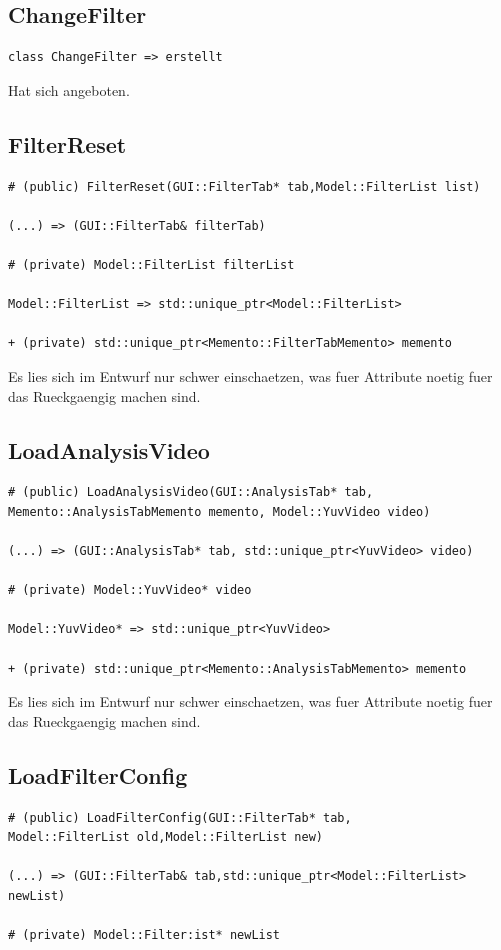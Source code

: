 \documentclass{scrartcl}
\begin{document}
{\subsection{ChangeFilter}
\begin{verbatim}
class ChangeFilter => erstellt
\end{verbatim}
Hat sich angeboten.
\subsection{FilterReset}
\begin{verbatim}
# (public) FilterReset(GUI::FilterTab* tab,Model::FilterList list)

(...) => (GUI::FilterTab& filterTab)

# (private) Model::FilterList filterList

Model::FilterList => std::unique_ptr<Model::FilterList>

+ (private) std::unique_ptr<Memento::FilterTabMemento> memento
\end{verbatim}
Es lies sich im Entwurf nur schwer einschaetzen, was fuer Attribute noetig fuer das Rueckgaengig machen sind. 
\subsection{LoadAnalysisVideo}
\begin{verbatim}
# (public) LoadAnalysisVideo(GUI::AnalysisTab* tab, 
Memento::AnalysisTabMemento memento, Model::YuvVideo video)

(...) => (GUI::AnalysisTab* tab, std::unique_ptr<YuvVideo> video)

# (private) Model::YuvVideo* video

Model::YuvVideo* => std::unique_ptr<YuvVideo>

+ (private) std::unique_ptr<Memento::AnalysisTabMemento> memento
\end{verbatim}
Es lies sich im Entwurf nur schwer einschaetzen, was fuer Attribute noetig fuer das Rueckgaengig machen sind. 
\subsection{LoadFilterConfig}
\begin{verbatim}
# (public) LoadFilterConfig(GUI::FilterTab* tab,
Model::FilterList old,Model::FilterList new)

(...) => (GUI::FilterTab& tab,std::unique_ptr<Model::FilterList> newList)

# (private) Model::Filter:ist* newList


\end{verbatim}}
\end{document}
